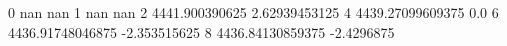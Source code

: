 0 nan nan
1 nan nan
2 4441.900390625 2.62939453125
4 4439.27099609375 0.0
6 4436.91748046875 -2.353515625
8 4436.84130859375 -2.4296875
